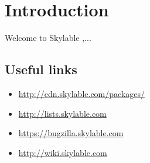 \chapter{Introduction}

Welcome to Skylable \SX,...

\section*{Useful links}
\begin{itemize}
    \item \url{http://cdn.skylable.com/packages/}
    \item \url{http://lists.skylable.com}
    \item \url{https://bugzilla.skylable.com}
    \item \url{http://wiki.skylable.com}
\end{itemize}

